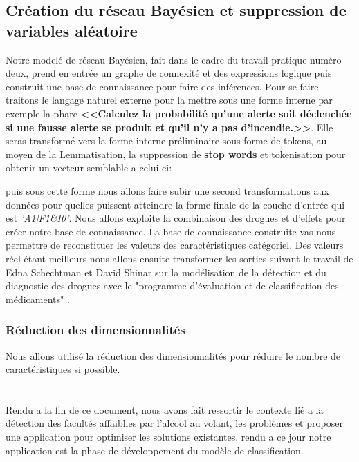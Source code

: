 \documentclass[12pt]{report}
\begin{document}
\subsection{Création du réseau Bayésien et suppression de variables aléatoire}

Notre modelé de réseau Bayésien, fait dans le cadre du travail pratique numéro deux, prend en entrée un graphe de connexité et des expressions logique puis construit une base de connaissance pour faire des inférences. Pour se faire traitons le langage naturel externe pour la mettre sous une forme interne par exemple la phare \textbf{<<Calculez la probabilité qu'une alerte soit déclenchée si une fausse alerte se produit et qu'il n'y a pas d’incendie.>>}. Elle seras transformé vers la forme interne préliminaire sous forme de tokens, au moyen de la Lemmatisation, la suppression de \textbf{stop words} et tokenisation pour obtenir un vecteur semblable a celui ci: 

\begin{displaymath}
    ['ALERTE','SI','FAUSSE', 'ALERTE','ET', 'PAS','INCENDIE']    
\end{displaymath}
puis sous cette forme nous allons faire subir une second transformations aux données pour quelles puissent atteindre la forme finale de la couche d'entrée qui est \textit{'A1|F1\&I0'}. Nous allons exploite la combinaison des drogues et d'effets pour créer notre base de connaissance. La base de connaissance construite vas nous permettre de reconstituer les valeurs des caractéristiques catégoriel. Des valeurs réel étant meilleurs nous allons ensuite transformer les sorties suivant le travail de Edna Schechtman et David Shinar sur la modélisation de la détection et du diagnostic des drogues avec le
"programme d’évaluation et de classification des médicaments" \cite{drugModeling}.
\subsubsection{Réduction des dimensionnalités}
Nous allons utilisé la réduction des dimensionnalités pour réduire le nombre de caractéristiques si possible. 


\newpage
\section*{}
\label{sec:conclu}
Rendu a la fin de ce document, nous avons fait ressortir le contexte lié a la détection des facultés affaiblies par l'alcool au volant, les problèmes et proposer une application pour optimiser les solutions existantes. rendu  a ce jour notre application est la phase de développement du modèle de classification.
\newpage
{}
\setcounter{page}{7}

{
    \singlespacing
    \thispagestyle{fancy}
    \fancyhead[LE,RO]{
          \thepage
        }
    
    \printindex
}
\newpage
{\singlespacing
\centering

\thispagestyle{fancy}
\fancyhead[LE,RO]{
  \thepage
}
{}


}
\end{document}
